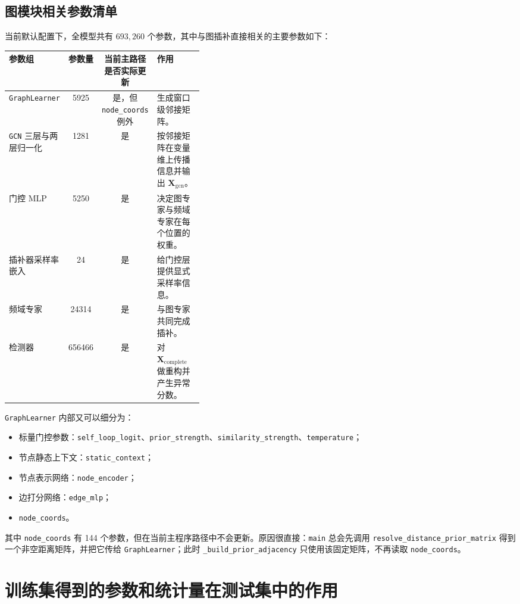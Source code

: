 \documentclass[UTF8]{ctexart}
\begin{document}
\subsection{图模块相关参数清单}

当前默认配置下，全模型共有 \(693{,}260\) 个参数，其中与图插补直接相关的主要参数如下：

\begin{center}
\small
\begin{tabular}{lccp{0.38\linewidth}}
\toprule
参数组 & 参数量 & 当前主路径是否实际更新 & 作用 \\
\midrule
\texttt{GraphLearner} & 5925 & 是，但 \texttt{node\_coords} 例外 & 生成窗口级邻接矩阵。 \\
\texttt{GCN} 三层与两层归一化 & 1281 & 是 & 按邻接矩阵在变量维上传播信息并输出 \(\bm{X}_{\text{gcn}}\)。 \\
门控 MLP & 5250 & 是 & 决定图专家与频域专家在每个位置的权重。 \\
插补器采样率嵌入 & 24 & 是 & 给门控层提供显式采样率信息。 \\
频域专家 & 24314 & 是 & 与图专家共同完成插补。 \\
检测器 & 656466 & 是 & 对 \(\bm{X}_{\text{complete}}\) 做重构并产生异常分数。 \\
\bottomrule
\end{tabular}
\end{center}

\texttt{GraphLearner} 内部又可以细分为：
\begin{itemize}
    \item 标量门控参数：\texttt{self\_loop\_logit}、\texttt{prior\_strength}、\texttt{similarity\_strength}、\texttt{temperature}；
    \item 节点静态上下文：\texttt{static\_context}；
    \item 节点表示网络：\texttt{node\_encoder}；
    \item 边打分网络：\texttt{edge\_mlp}；
    \item \texttt{node\_coords}。
\end{itemize}

其中 \texttt{node\_coords} 有 144 个参数，但在当前主程序路径中不会更新。原因很直接：\texttt{main} 总会先调用 \texttt{resolve\_distance\_prior\_matrix} 得到一个非空距离矩阵，并把它传给 \texttt{GraphLearner}；此时 \texttt{\_build\_prior\_adjacency} 只使用该固定矩阵，不再读取 \texttt{node\_coords}。

\section{训练集得到的参数和统计量在测试集中的作用}
\end{document}
